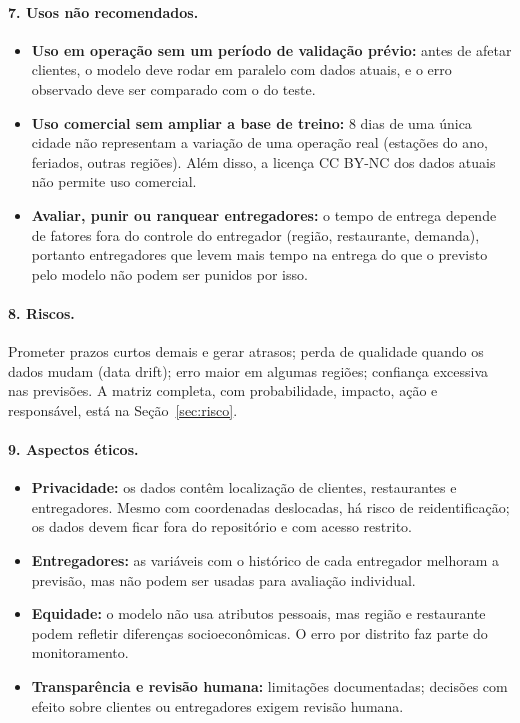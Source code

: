 \documentclass[11pt,a4paper]{article}
\begin{document}
\paragraph{7. Usos não recomendados.}
\begin{itemize}
  \item \textbf{Uso em operação sem um período de validação prévio:} antes de afetar clientes,
        o modelo deve rodar em paralelo com dados atuais, e o erro observado deve ser comparado
        com o do teste.
  \item \textbf{Uso comercial sem ampliar a base de treino:} 8 dias de uma única cidade não
        representam a variação de uma operação real (estações do ano, feriados, outras
        regiões). Além disso, a licença CC BY-NC dos dados atuais não permite uso comercial.
  \item \textbf{Avaliar, punir ou ranquear entregadores:} o tempo de entrega depende de fatores
        fora do controle do entregador (região, restaurante, demanda), portanto entregadores que
        levem mais tempo na entrega do que o previsto pelo modelo não podem ser punidos por isso.
\end{itemize}

\paragraph{8. Riscos.} Prometer prazos curtos demais e gerar atrasos; perda de qualidade
quando os dados mudam (data drift); erro maior em algumas regiões; confiança excessiva nas
previsões. A matriz completa, com probabilidade, impacto, ação e responsável, está na
Seção~\ref{sec:risco}.

\paragraph{9. Aspectos éticos.}
\begin{itemize}
  \item \textbf{Privacidade:} os dados contêm localização de clientes, restaurantes e
        entregadores. Mesmo com coordenadas deslocadas, há risco de reidentificação; os dados
        devem ficar fora do repositório e com acesso restrito.
  \item \textbf{Entregadores:} as variáveis com o histórico de cada entregador melhoram a
        previsão, mas não podem ser usadas para avaliação individual.
  \item \textbf{Equidade:} o modelo não usa atributos pessoais, mas região e restaurante podem
        refletir diferenças socioeconômicas. O erro por distrito faz parte do monitoramento.
  \item \textbf{Transparência e revisão humana:} limitações documentadas; decisões com efeito
        sobre clientes ou entregadores exigem revisão humana.
\end{itemize}
\end{document}
